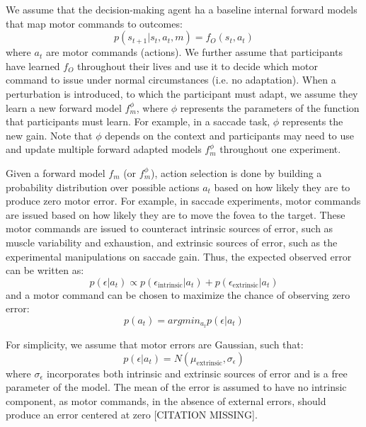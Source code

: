\documentclass[a4paper,doc,floatsintext,natbib]{apa6}
\begin{document}
We assume that the decision-making agent ha a baseline internal forward models that
map motor commands to outcomes:
\begin{equation}
p(s_{t+1} | s_t, a_t, m) = f_O(s_t, a_t)
\end{equation}
where $a_t$ are motor commands (actions). We further assume that participants
have learned $f_O$ throughout their lives and use it to decide which motor
command to issue under normal circumstances (i.e. no adaptation). When a
perturbation is introduced, to which the participant must adapt, we assume they
learn a new forward model $f_m^{\phi}$, where $\phi$ represents the parameters
of the function that participants must learn. For example, in a saccade task,
$\phi$ represents the new gain. Note that $\phi$ depends on the context and
participants may need to use and update multiple forward adapted models
$f_m^{\phi}$ throughout one experiment.

Given a forward model $f_m$ (or $f_m^\phi$), action selection is done by
building a probability distribution over possible actions $a_t$ based on how
likely they are to produce zero motor error. For example, in saccade
experiments, motor commands are issued based on how likely they are to move the
fovea to the target. These motor commands are issued to counteract intrinsic
sources of error, such as muscle variability and exhaustion, and extrinsic
sources of error, such as the experimental manipulations on saccade gain. Thus,
the expected observed error can be written as:
\begin{equation}
p(\epsilon | a_t) \propto p(\epsilon_{\text{intrinsic}} | a_t) + p(\epsilon_{\text{extrinsic}} | a_t)
\end{equation}
and a motor command can be chosen to maximize the chance of observing zero error:
\begin{equation}
p(a_t) = argmin_{a_t} p(\epsilon | a_t)
\end{equation}

For simplicity, we assume that motor errors are Gaussian, such that:
\begin{equation}
p(\epsilon | a_t) = N(\mu_{\text{extrinsic}}, \sigma_\epsilon)
\end{equation}
where $\sigma_\epsilon$ incorporates both intrinsic and extrinsic sources of
error and is a free parameter of the model. The mean of the error is assumed to
have no intrinsic component, as motor commands, in the absence of external
errors, should produce an error centered at zero [CITATION MISSING].
\end{document}
